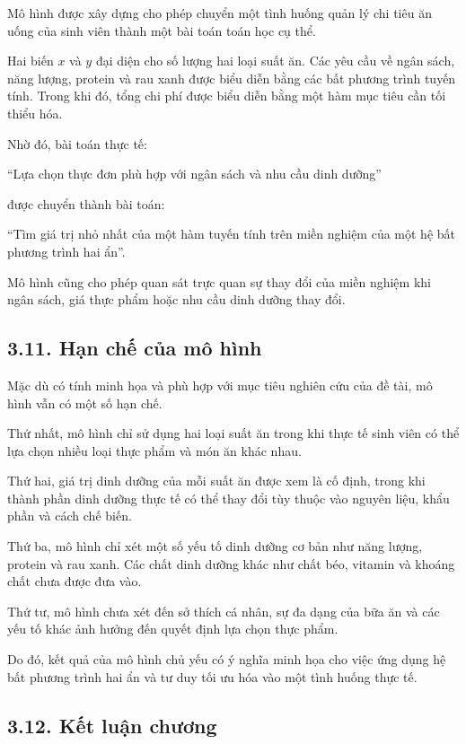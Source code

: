 \documentclass[12pt,a4paper]{article}
\begin{document}
Mô hình được xây dựng cho phép chuyển một tình huống quản lý chi tiêu ăn uống của sinh viên thành một bài toán toán học cụ thể.

Hai biến $x$ và $y$ đại diện cho số lượng hai loại suất ăn. Các yêu cầu về ngân sách, năng lượng, protein và rau xanh được biểu diễn bằng các bất phương trình tuyến tính. Trong khi đó, tổng chi phí được biểu diễn bằng một hàm mục tiêu cần tối thiểu hóa.

Nhờ đó, bài toán thực tế:
\begin{center}
``Lựa chọn thực đơn phù hợp với ngân sách và nhu cầu dinh dưỡng''
\end{center}
được chuyển thành bài toán:
\begin{center}
``Tìm giá trị nhỏ nhất của một hàm tuyến tính trên miền nghiệm của một hệ bất phương trình hai ẩn''.
\end{center}
Mô hình cũng cho phép quan sát trực quan sự thay đổi của miền nghiệm khi ngân sách, giá thực phẩm hoặc nhu cầu dinh dưỡng thay đổi.

\subsection*{3.11. Hạn chế của mô hình}

Mặc dù có tính minh họa và phù hợp với mục tiêu nghiên cứu của đề tài, mô hình vẫn có một số hạn chế.

Thứ nhất, mô hình chỉ sử dụng hai loại suất ăn trong khi thực tế sinh viên có thể lựa chọn nhiều loại thực phẩm và món ăn khác nhau.

Thứ hai, giá trị dinh dưỡng của mỗi suất ăn được xem là cố định, trong khi thành phần dinh dưỡng thực tế có thể thay đổi tùy thuộc vào nguyên liệu, khẩu phần và cách chế biến.

Thứ ba, mô hình chỉ xét một số yếu tố dinh dưỡng cơ bản như năng lượng, protein và rau xanh. Các chất dinh dưỡng khác như chất béo, vitamin và khoáng chất chưa được đưa vào.

Thứ tư, mô hình chưa xét đến sở thích cá nhân, sự đa dạng của bữa ăn và các yếu tố khác ảnh hưởng đến quyết định lựa chọn thực phẩm.

Do đó, kết quả của mô hình chủ yếu có ý nghĩa minh họa cho việc ứng dụng hệ bất phương trình hai ẩn và tư duy tối ưu hóa vào một tình huống thực tế.

\subsection*{3.12. Kết luận chương}
\end{document}
